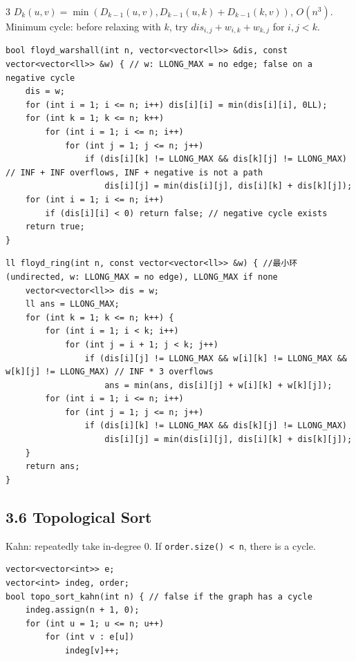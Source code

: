 \documentclass[8pt]{extarticle}
\begin{document}
\begin{multicols*}{3}
$D_k(u, v) = \min(D_{k-1}(u, v), D_{k-1}(u, k) + D_{k-1}(k, v))$, $O(n^3)$. Minimum cycle: before relaxing with $k$, try $dis_{i,j} + w_{i,k} + w_{k,j}$ for $i, j < k$.

\begin{lstlisting}
bool floyd_warshall(int n, vector<vector<ll>> &dis, const vector<vector<ll>> &w) { // w: LLONG_MAX = no edge; false on a negative cycle
    dis = w;
    for (int i = 1; i <= n; i++) dis[i][i] = min(dis[i][i], 0LL);
    for (int k = 1; k <= n; k++)
        for (int i = 1; i <= n; i++)
            for (int j = 1; j <= n; j++)
                if (dis[i][k] != LLONG_MAX && dis[k][j] != LLONG_MAX) // INF + INF overflows, INF + negative is not a path
                    dis[i][j] = min(dis[i][j], dis[i][k] + dis[k][j]);
    for (int i = 1; i <= n; i++)
        if (dis[i][i] < 0) return false; // negative cycle exists
    return true;
}
\end{lstlisting}

\begin{lstlisting}
ll floyd_ring(int n, const vector<vector<ll>> &w) { //最小环 (undirected, w: LLONG_MAX = no edge), LLONG_MAX if none
    vector<vector<ll>> dis = w;
    ll ans = LLONG_MAX;
    for (int k = 1; k <= n; k++) {
        for (int i = 1; i < k; i++)
            for (int j = i + 1; j < k; j++)
                if (dis[i][j] != LLONG_MAX && w[i][k] != LLONG_MAX && w[k][j] != LLONG_MAX) // INF * 3 overflows
                    ans = min(ans, dis[i][j] + w[i][k] + w[k][j]);
        for (int i = 1; i <= n; i++)
            for (int j = 1; j <= n; j++)
                if (dis[i][k] != LLONG_MAX && dis[k][j] != LLONG_MAX)
                    dis[i][j] = min(dis[i][j], dis[i][k] + dis[k][j]);
    }
    return ans;
}
\end{lstlisting}

\subsection*{3.6 Topological Sort}

Kahn: repeatedly take in-degree 0. If \texttt{order.size() < n}, there is a cycle.

\begin{lstlisting}
vector<vector<int>> e;
vector<int> indeg, order;
bool topo_sort_kahn(int n) { // false if the graph has a cycle
    indeg.assign(n + 1, 0);
    for (int u = 1; u <= n; u++)
        for (int v : e[u])
            indeg[v]++;


\end{lstlisting}
\end{multicols*}
\end{document}
